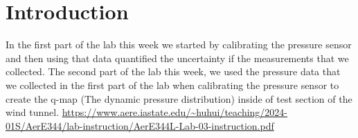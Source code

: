 \chapter{Introduction}
\label{cp:introduction}
In the first part of the lab this week we started by calibrating the pressure sensor and then using that data quantified the uncertainty if the measurements that we collected. The second part of the lab this week, we used the pressure data that we collected in the first part of the lab when calibrating the pressure sensor to create the q-map (The dynamic pressure distribution) inside of test section of the wind tunnel. \url{https://www.aere.iastate.edu/~huhui/teaching/2024-01S/AerE344/lab-instruction/AerE344L-Lab-03-instruction.pdf}